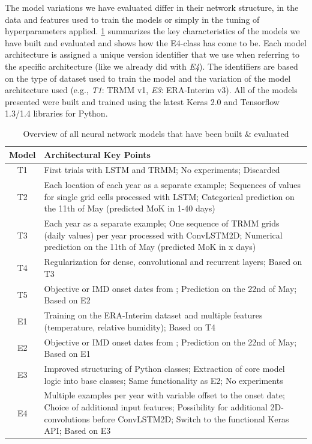 The model variations we have evaluated differ in their network structure, in the data and features used to train the models or simply in the tuning of hyperparameters applied. \cref{tab:nn_overall_summary} summarizes the key characteristics of the models we have built and evaluated and shows how the E4-class has come to be. Each model architecture is assigned a unique version identifier that we use when referring to the specific architecture (like we already did with \textit{E4}). The identifiers are based on the type of dataset used to train the model and the variation of the model architecture used (e.g., \textit{T1}: TRMM v1, \textit{E3}: ERA-Interim v3). All of the models presented were built and trained using the latest Keras 2.0 and Tensorflow 1.3/1.4 libraries for Python.

\begin{table}[h!]
  \begin{tabularx}{\linewidth}{c|X}
    \toprule
    \textbf{Model} & \textbf{Architectural Key Points} \\
    \midrule
    T1 & First trials with LSTM and TRMM; No experiments; Discarded \\
    T2 & Each location of each year as a separate example; Sequences of values for single grid cells processed with LSTM; Categorical prediction on the 11th of May (predicted MoK in 1-40 days) \\
    T3 & Each year as a separate example; One sequence of TRMM grids (daily values) per year processed with ConvLSTM2D; Numerical prediction on the 11th of May (predicted MoK in x days) \\
    T4 & Regularization for dense, convolutional and recurrent layers; Based on T3 \\
    T5 & Objective or IMD onset dates from \citet{Singh.2009}; Prediction on the 22nd of May; Based on E2 \\
    \midrule
    E1 & Training on the ERA-Interim dataset and multiple features (temperature, relative humidity); Based on T4 \\
    E2 & Objective or IMD onset dates from \citet{Singh.2009}; Prediction on the 22nd of May; Based on E1 \\
    E3 & Improved structuring of Python classes; Extraction of core model logic into base classes; Same functionality as E2; No experiments \\
    E4 & Multiple examples per year with variable offset to the onset date; Choice of additional input features; Possibility for additional 2D-convolutions before ConvLSTM2D; Switch to the functional Keras API; Based on E3 \\
    \bottomrule
  \end{tabularx}
  \caption{Overview of all neural network models that have been built \& evaluated}
  \label{tab:nn_overall_summary}
\end{table}

